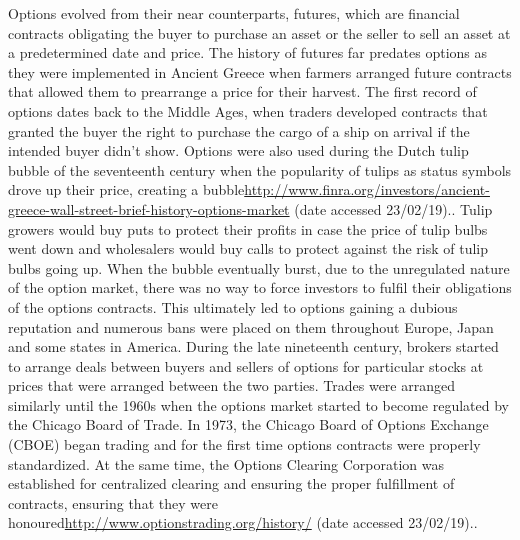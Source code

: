 Options evolved from their near counterparts, futures, which are financial contracts obligating the buyer to purchase an asset or the seller to sell an asset at a predetermined date and price. The history of futures far predates options as they were implemented in Ancient Greece when farmers arranged future contracts that allowed them to prearrange a price for their harvest. 
\nline
The first record of options dates back to the Middle Ages, when traders developed contracts that granted the buyer the right to purchase the cargo of a ship on arrival if the intended buyer didn't show. Options were also used during the Dutch tulip bubble of the seventeenth century when the popularity of tulips as status symbols drove up their price, creating a bubble{\url{http://www.finra.org/investors/ancient-greece-wall-street-brief-history-options-market} (date accessed 23/02/19).\label{history}}. Tulip growers would buy puts to protect their profits in case the price of tulip bulbs went down and wholesalers would buy calls to protect against the risk of tulip bulbs going up. When the bubble eventually burst, due to the unregulated nature of the option market, there was no way to force investors to fulfil their obligations of the options contracts. This ultimately led to options gaining a dubious reputation and numerous bans were placed on them throughout Europe, Japan and some states in America. 
\nline
During the late nineteenth century, brokers started to arrange deals between buyers and sellers of options for particular stocks at prices that were arranged between the two parties. Trades were arranged similarly until the 1960s when the options market started to become regulated by the Chicago Board of Trade. In 1973, the Chicago Board of Options Exchange (CBOE) began trading and for the first time options contracts were properly standardized. At the same time, the Options Clearing Corporation was established for centralized clearing and ensuring the proper fulfillment of contracts, ensuring that they were honoured{\url{http://www.optionstrading.org/history/} (date accessed 23/02/19).}.


